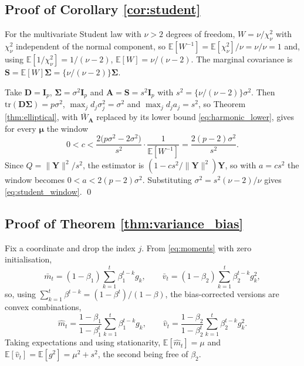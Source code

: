 \documentclass[pdflatex,sn-mathphys-num]{sn-jnl}%
\theoremstyle{thmstyleone}%
\theoremstyle{thmstyletwo}%
\theoremstyle{thmstylethree}%
\newcommand{\rev}[1]{#1}
\newcommand{\tr}{\mathrm{tr}}
\newcommand{\E}{\mathbb{E}}
\begin{document}
\begin{appendices}
\subsection*{Proof of Corollary \ref{cor:student}}

For the multivariate Student law with $\nu>2$ degrees of freedom, $W=\nu/\chi^2_\nu$ with $\chi^2_\nu$ independent of the normal component, so $\E[W^{-1}]=\E[\chi^2_\nu]/\nu=\nu/\nu=1$ and, using $\E[1/\chi^2_\nu]=1/(\nu-2)$, $\E[W]=\nu/(\nu-2)$. The marginal covariance is $\bm S=\E[W]\bm\Sigma=\{\nu/(\nu-2)\}\bm\Sigma$.

Take $\bm D=\bm I_p$, $\bm\Sigma=\sigma^2\bm I_p$ and $\bm A=\bm S=s^2\bm I_p$ with $s^2=\{\nu/(\nu-2)\}\sigma^2$. Then $\tr(\bm D\bm\Sigma)=p\sigma^2$, $\max_jd_j\sigma^2_j=\sigma^2$ and $\max_jd_ja_j=s^2$, so \rev{Theorem \ref{thm:elliptical}, with $\bar W_{\bm A}$ replaced by its lower bound \eqref{eq:harmonic_lower}, gives for every $\bm\mu$ the window}
\begin{equation}
0<c<\frac{2\bigl(p\sigma^2-2\sigma^2\bigr)}{s^2}\cdot\frac{1}{\E[W^{-1}]}
=\frac{2(p-2)\sigma^2}{s^2} .
\end{equation}
Since $Q=\|\bm Y\|^2/s^2$, the estimator is $(1-cs^2/\|\bm Y\|^2)\bm Y$, so with $a=cs^2$ the window becomes $0<a<2(p-2)\sigma^2$. Substituting $\sigma^2=s^2(\nu-2)/\nu$ gives \eqref{eq:student_window}. \qed

\subsection*{Proof of Theorem \ref{thm:variance_bias}}

Fix a coordinate and drop the index $j$. From \eqref{eq:moments} with zero initialisation,
\begin{equation}
\bar m_t=(1-\beta_1)\sum_{k=1}^{t}\beta_1^{t-k}g_k,
\qquad
\bar v_t=(1-\beta_2)\sum_{k=1}^{t}\beta_2^{t-k}g^2_k ,
\end{equation}
so, using $\sum_{k=1}^{t}\beta^{t-k}=(1-\beta^{t})/(1-\beta)$, the bias-corrected versions are convex combinations,
\begin{equation}
\hat m_t=\frac{1-\beta_1}{1-\beta_1^{t}}\sum_{k=1}^{t}\beta_1^{t-k}g_k,
\qquad
\hat v_t=\frac{1-\beta_2}{1-\beta_2^{t}}\sum_{k=1}^{t}\beta_2^{t-k}g^2_k .
\end{equation}
Taking expectations and using stationarity, $\E[\hat m_t]=\mu$ and $\E[\hat v_t]=\E[g^2]=\mu^2+s^2$, the second being free of $\beta_2$.


\end{appendices}
\end{document}
